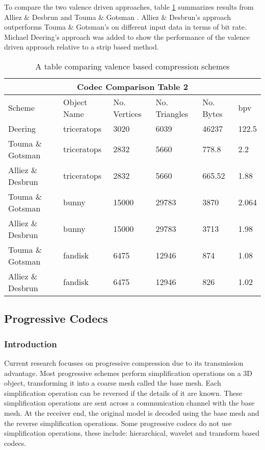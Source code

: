 To compare the two valence driven approaches, table \ref{table:schemeComparisonTable2} summarizes results from Alliez \& Desbrun \cite{Alliez01Valence-Driven} and Touma \& Gotsman \cite{touma98triangle}. Alliez \& Desbrun's approach outperforms Touma \& Gotsman's on different input data in terms of bit rate. Michael Deering's approach was added to show the performance of the valence driven approach relative to a strip based method.
\begin{table}[!h]
\begin{tabular}[c]{|l|l|l|l|l|l|}
\hline
\multicolumn{6}{|c|}{Codec Comparison Table 2}\\
\hline
Scheme & Object Name & No. Vertices & No. Triangles & No. Bytes & bpv\\
\hline
Deering & triceratops & 3020 & 6039 & 46237 & 122.5\\
Touma \& Gotsman & triceratops & 2832 & 5660 & 778.8 & 2.2\\
Alliez \& Desbrun & triceratops & 2832 & 5660 & 665.52 & 1.88\\
Touma \& Gotsman & bunny & 15000 & 29783 & 3870 & 2.064\\
Alliez \& Desbrun & bunny & 15000 & 29783 & 3713 & 1.98\\
Touma \& Gotsman & fandisk & 6475 & 12946 & 874 & 1.08\\
Alliez \& Desbrun & fandisk & 6475 & 12946 & 826 & 1.02\\
\hline
\end{tabular}
\caption{A table comparing valence based compression schemes \cite{Alliez01Valence-Driven,touma98triangle}}
\label{table:schemeComparisonTable2}
\end{table}
\subsection{Progressive Codecs}

\subsubsection{Introduction}

Current research focusses on progressive compression due to its transmission advantage. Most progressive schemes perform simplification operations on a 3D object, transforming it into a coarse mesh called the base mesh. Each simplification operation can be reversed if the details of it are known. These simplification operations are sent across a communication channel with the base mesh. At the receiver end, the original model is decoded using the base mesh and the reverse simplification operations. Some progressive codecs do not use simplification operations, these include: hierarchical, wavelet and transform based codecs. 

